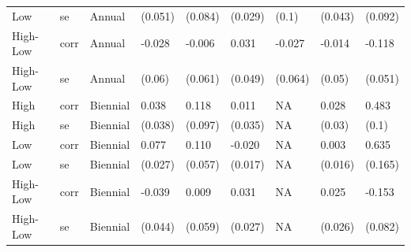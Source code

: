\begin{tabular}{l|l|l|l|l|l|l|l|l}
Low & se & Annual & (0.051) & (0.084) & (0.029) & (0.1) & (0.043) & (0.092)\\
High-Low & corr & Annual & -0.028 & -0.006 & 0.031 & -0.027 & -0.014 & -0.118\\
High-Low & se & Annual & (0.06) & (0.061) & (0.049) & (0.064) & (0.05) & (0.051)\\
High & corr & Biennial & 0.038 & 0.118 & 0.011 & NA & 0.028 & 0.483\\
High & se & Biennial & (0.038) & (0.097) & (0.035) & NA & (0.03) & (0.1)\\
Low & corr & Biennial & 0.077 & 0.110 & -0.020 & NA & 0.003 & 0.635\\
Low & se & Biennial & (0.027) & (0.057) & (0.017) & NA & (0.016) & (0.165)\\
High-Low & corr & Biennial & -0.039 & 0.009 & 0.031 & NA & 0.025 & -0.153\\
High-Low & se & Biennial & (0.044) & (0.059) & (0.027) & NA & (0.026) & (0.082)\\
\hline
\end{tabular}
